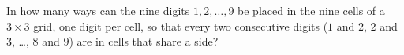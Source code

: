 In how many ways can the nine digits $1,2,\dots,9$ be placed in the nine cells of a $3\times3$ grid, one digit per cell, so that every two consecutive digits ($1$ and $2$, $2$ and $3$, \dots, $8$ and $9$) are in cells that share a side?
